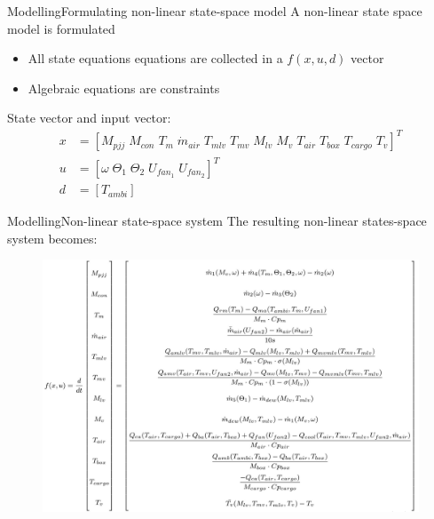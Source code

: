 \begin{frame}{Modelling}{Formulating non-linear state-space model}
	A non-linear state space model is formulated
	\begin{itemize}
		\item All state equations equations are collected in a $f(x,u,d)$ vector
		\item Algebraic equations are constraints
	\end{itemize}
	State vector and input vector:
	\begin{equation}  \label{eq:xu}
		\begin{split}
			x & = [M_{pjj}	\;
				M_{con} \;
				T_m \;
				\dot{m}_{air}\;
				T_{mlv}      \;
				T_{mv}       \;
				M_{lv}       \;
				M_v          \;
				T_{air}      \;
				T_{box}      \;
				T_{cargo}    \;
				T_v]^T \\
			u & = [\omega	\;
				\Theta_1	\;
				\Theta_2     \;
				U_{fan_1}    \;
				U_{fan_2}]^T \\
			d & = [T_{ambi}]
		\end{split}
	\end{equation}

\end{frame}




\begin{frame}{Modelling}{Non-linear state-space system}
	The resulting non-linear states-space system becomes:
	\begin{figure}[h!]
		\centering
		\includegraphics[width=1.04\textwidth]{Graphics/f_x_u.jpeg}
		\label{fig:f_x_u}
	\end{figure}
\end{frame}






